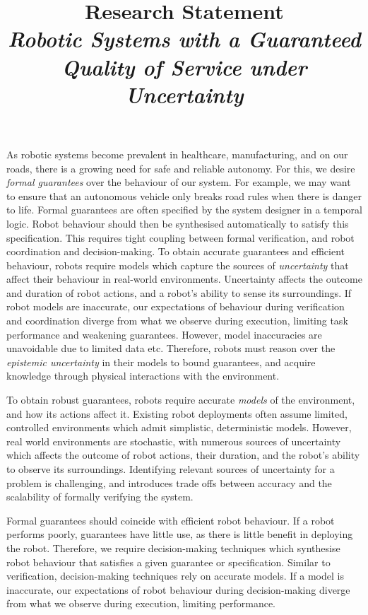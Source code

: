 \documentclass[12pt]{article}
\title{Research Statement\\ \large \emph{Robotic Systems with a Guaranteed Quality of Service under Uncertainty}}
\date{}
\author{}
\begin{document}
\maketitle
\thispagestyle{empty}


As robotic systems become prevalent in healthcare, manufacturing, and on our roads, there is a growing need for safe and reliable autonomy.
%
For this, we desire \emph{formal guarantees} over the behaviour of our system.
%
For example, we may want to ensure that an autonomous vehicle only breaks road rules when there is danger to life.
%
Formal guarantees are often specified by the system designer in a temporal logic.
%
Robot behaviour should then be synthesised automatically to satisfy this specification.
%
This requires tight coupling between formal verification, and robot coordination and decision-making.
%
To obtain accurate guarantees and efficient behaviour, robots require models which capture the sources of \emph{uncertainty} that affect their behaviour in real-world environments.
%
Uncertainty affects the outcome and duration of robot actions, and a robot's ability to sense its surroundings.
%
If robot models are inaccurate, our expectations of behaviour during verification and coordination diverge from what we observe during execution, limiting task performance and weakening guarantees.
%
However, model inaccuracies are unavoidable due to limited data etc.
%
Therefore, robots must reason over the \emph{epistemic uncertainty} in their models to bound guarantees, and acquire knowledge through physical interactions with the environment.


\iffalse
%
To obtain robust guarantees, robots require accurate \emph{models} of the environment, and how its actions affect it.
%
Existing robot deployments often assume limited, controlled environments which admit simplistic, deterministic models.
%
However, real world environments are stochastic, with numerous sources of uncertainty which affects the outcome of robot actions, their duration, and the robot's ability to observe its surroundings.
%
Identifying relevant sources of uncertainty for a problem is challenging, and introduces trade offs between accuracy and the scalability of formally verifying the system.



Formal guarantees should coincide with efficient robot behaviour.
%
If a robot performs poorly, guarantees have little use, as there is little benefit in deploying the robot.
%
Therefore, we require decision-making techniques which synthesise robot behaviour that satisfies a given guarantee or specification.
%
Similar to verification, decision-making techniques rely on accurate models.
%
If a model is inaccurate, our expectations of robot behaviour during decision-making diverge from what we observe during execution, limiting performance.
\end{document}
